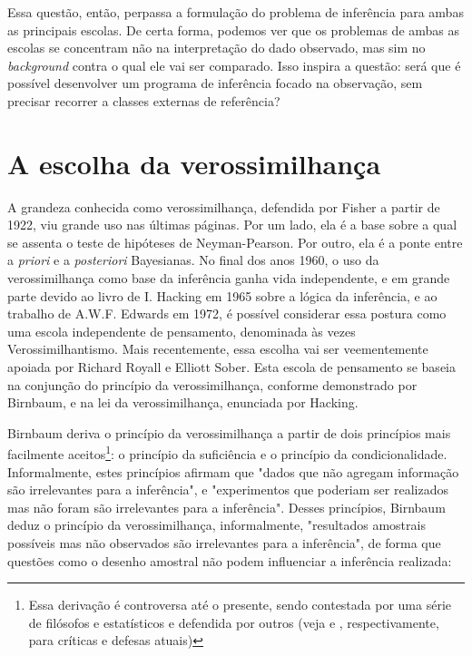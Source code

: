 Essa questão, então, perpassa a formulação do problema de inferência para ambas as principais escolas. De certa forma,
podemos ver que os problemas de ambas as escolas se concentram não na interpretação do dado observado, mas sim
no {\em background} contra o qual ele vai ser comparado. Isso inspira a questão: será que é possível desenvolver
um programa de inferência focado na observação, sem precisar recorrer a classes externas de referência?

\section{A escolha da verossimilhança}\label{sec:likelihood}

A grandeza conhecida como verossimilhança, defendida por Fisher a partir de 1922, viu grande uso nas últimas páginas. Por um lado,
ela é a base sobre a qual se assenta o teste de hipóteses de Neyman-Pearson. Por outro, ela é a ponte entre a {\em priori}
e a {\em posteriori} Bayesianas. No final dos anos 1960, o uso da verossimilhança como base da inferência ganha vida 
independente, e em grande parte devido ao livro de I. Hacking em 1965 sobre a lógica da inferência, 
e ao trabalho de A.W.F. Edwards em 1972, é possível considerar essa postura como
uma escola independente de pensamento, denominada às vezes Verossimilhantismo. Mais recentemente, essa escolha vai ser
veementemente apoiada por Richard Royall e Elliott Sober. Esta escola de pensamento se baseia na conjunção do princípio da 
verossimilhança, conforme demonstrado por Birnbaum, e na lei da verossimilhança, enunciada por Hacking.

Birnbaum deriva o princípio da verossimilhança a partir de dois princípios mais facilmente aceitos\footnote{
Essa derivação é controversa até o presente, sendo contestada por uma série de filósofos e estatísticos 
e defendida por outros (veja \citep{Mayo10} e \citep{Gandenberger12}, respectivamente, para críticas e defesas
atuais)}: o princípio da suficiência e o princípio da condicionalidade. Informalmente, estes princípios afirmam que
"dados que não agregam informação são irrelevantes para a inferência", e "experimentos que poderiam ser realizados
mas não foram são irrelevantes para a inferência". Desses princípios, Birnbaum deduz o princípio da verossimilhança,
informalmente, "resultados amostrais possíveis mas não observados são irrelevantes para a inferência", de forma 
que questões como o desenho amostral não podem influenciar a inferência realizada: 

